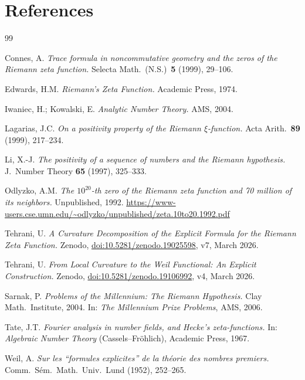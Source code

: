 \documentclass[11pt]{article}
\begin{document}
\section*{References}

\begin{thebibliography}{99}

Connes, A.
\textit{Trace formula in noncommutative geometry and the zeros of the Riemann
zeta function.}
Selecta Math.\ (N.S.)\ \textbf{5} (1999), 29--106.

Edwards, H.M.
\textit{Riemann's Zeta Function.}
Academic Press, 1974.

Iwaniec, H.; Kowalski, E.
\textit{Analytic Number Theory.}
AMS, 2004.

Lagarias, J.C.
\textit{On a positivity property of the Riemann $\xi$-function.}
Acta Arith.\ \textbf{89} (1999), 217--234.

Li, X.-J.
\textit{The positivity of a sequence of numbers and the Riemann hypothesis.}
J.\ Number Theory \textbf{65} (1997), 325--333.

Odlyzko, A.M.
\textit{The $10^{20}$-th zero of the Riemann zeta function and 70 million of
its neighbors.} Unpublished, 1992.
\url{https://www-users.cse.umn.edu/~odlyzko/unpublished/zeta.10to20.1992.pdf}

Tehrani, U.
\textit{A Curvature Decomposition of the Explicit Formula for the Riemann Zeta
Function.}
Zenodo, \href{https://doi.org/10.5281/zenodo.19025598}{doi:10.5281/zenodo.19025598},
v7, March 2026.

Tehrani, U.
\textit{From Local Curvature to the Weil Functional: An Explicit Construction.}
Zenodo, \href{https://doi.org/10.5281/zenodo.19106992}{doi:10.5281/zenodo.19106992},
v4, March 2026.

Sarnak, P.
\textit{Problems of the Millennium: The Riemann Hypothesis.}
Clay Math.\ Institute, 2004.
In: \textit{The Millennium Prize Problems}, AMS, 2006.

Tate, J.T.
\textit{Fourier analysis in number fields, and Hecke's zeta-functions.}
In: \textit{Algebraic Number Theory} (Cassels--Fr\"ohlich), Academic Press, 1967.

Weil, A.
\textit{Sur les ``formules explicites'' de la th\'eorie des nombres premiers.}
Comm.\ S\'em.\ Math.\ Univ.\ Lund (1952), 252--265.

\end{thebibliography}
\end{document}
